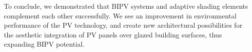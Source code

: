 To conclude, we demonstrated that BIPV systems and adaptive shading elements complement each other successfully. We see an improvement in environmental performance of the PV technology, and create new architectural possibilities for the aesthetic integration of PV panels over glazed building surfaces, thus expanding BIPV potential. 






